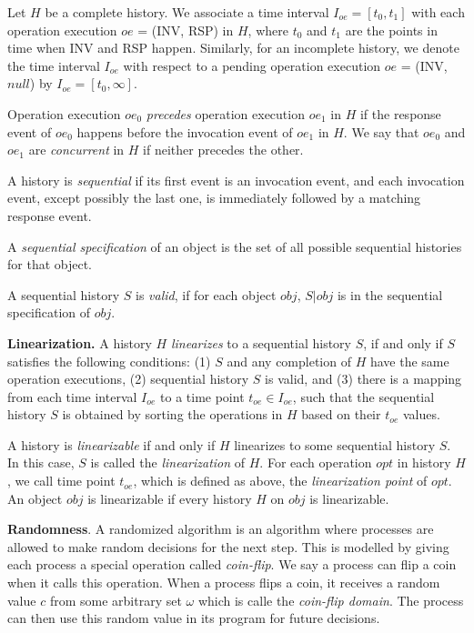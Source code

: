 Let $H$ be a complete history. We associate a time interval $I_{oe} = [t_0, t_1]$ with each
operation execution $oe$ = (INV, RSP) in $H$, where $t_0$ and $t_1$ are the points in time when INV and RSP happen.
Similarly, for an incomplete history, we denote the time interval $I_{oe}$ with respect to a pending
operation execution $oe$ = (INV, $null$) by $I_{oe} = [t_0, \infty]$.

Operation execution $oe_0$ \emph{precedes} operation execution $oe_1$ in $H$ if the response event of
$oe_0$ happens before the invocation event of $oe_1$ in $H$.
We say that $oe_0$ and $oe_1$ are \emph{concurrent} in $H$ if neither precedes the other.

A history is \emph{sequential} if its first event is an invocation event, and each invocation event, except
possibly the last one, is immediately followed by a matching response event.

A \emph{sequential specification} of an object is the set of all possible sequential histories
for that object.

A sequential history $S$ is \emph{valid}, if for each object $obj$, $S|obj$ is
in the sequential specification of $obj$.

\textbf{Linearization.}
A history $H$ \emph{linearizes} to a sequential history $S$, if and only if $S$ satisfies the
following conditions: (1) $S$ and any completion of $H$ have the same operation executions, (2) sequential history $S$ is
valid, and (3) there is a mapping from each time interval $I_{oe}$ to a time point $t_{oe} \in I_{oe}$, such
that the sequential history $S$ is obtained by sorting the operations in $H$ based on their $t_{oe}$ values.

A history is \emph{linearizable} if and only if $H$ linearizes to some sequential history $S$. In this case,
$S$ is called the \emph{linearization} of $H$. For each operation $opt$ in history $H$, we call time point $t_{oe}$, which is
defined as above, the \emph{linearization point} of $opt$. An object $obj$ is linearizable if every history $H$ on $obj$ is linearizable.

\textbf{Randomness}.
A randomized algorithm is an algorithm where processes are allowed to make random decisions for the next step.
This is modelled by giving each process a special operation called \emph{coin-flip}. We say a process can flip a coin
when it calls this operation. When a process flips a coin, it receives a random value $c$ from some arbitrary set $\omega$
which is calle the \emph{coin-flip domain}. The process can then use this random value in its program for future decisions.


